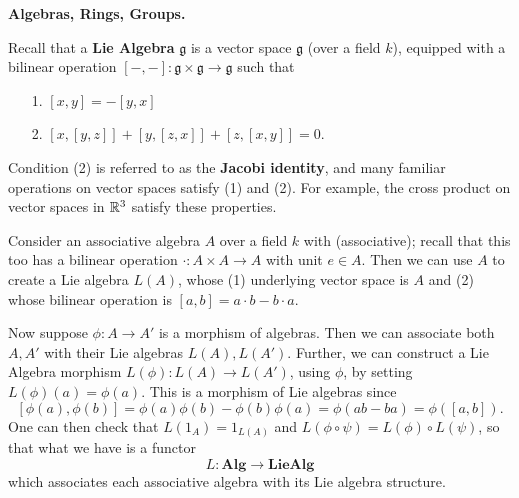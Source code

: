     \vspace{0.5cm}

    {\large\noindent \textbf{Algebras, Rings, Groups.}\par}
    \begin{example}
        Recall that a \textbf{Lie Algebra} $\mathfrak{g}$ is a vector space 
        $\mathfrak{g}$ (over a field $k$), equipped with a bilinear operation 
        $[-, -]: \mathfrak{g}\times \mathfrak{g} \to \mathfrak{g}$
        such that 
        \begin{itemize}
            \item[1.] $[x, y] = -[y, x]$
            \item[2.] $[x, [y, z]] + [y, [z, x]] + [z, [x,y]] = 0$. 
        \end{itemize}
        Condition (2) is referred to as the \textbf{Jacobi identity}, and many 
        familiar operations on vector spaces satisfy (1) and (2). For example, the cross 
        product on vector spaces in $\mathbb{R}^3$ satisfy these properties. 

        Consider an associative algebra $A$ over a field $k$ with (associative); recall 
        that this too has a bilinear operation $\cdot: A \times A \to A$ with unit $e \in A$. 
        Then we can use $A$ to create a Lie algebra $L(A)$, whose (1) underlying vector 
        space is $A$ and (2) whose bilinear operation is $[a, b] = a \cdot b - b\cdot a$. 

        Now suppose $\phi: A \to A'$ is a morphism of algebras. Then we can associate 
        both $A, A'$ with their Lie algebras $L(A), L(A')$. Further, we can construct a Lie 
        Algebra morphism $L(\phi): L(A) \to L(A')$, using $\phi$, by setting 
        $L(\phi)(a) = \phi(a)$. This is a morphism of Lie algebras since 
        \[
            [\phi(a), \phi(b)] = \phi(a)\phi(b) - \phi(b)\phi(a) = \phi(ab - ba) = \phi([a, b]).
        \]
        One can then check that $L(1_A) = 1_{L(A)}$ and $L(\phi \circ \psi) = L(\phi)\circ L(\psi)$, so 
        that what we have is a functor 
        \[
            L: \textbf{Alg} \to \textbf{LieAlg}            
        \]
        which associates each associative algebra with its Lie algebra structure.
    \end{example}

